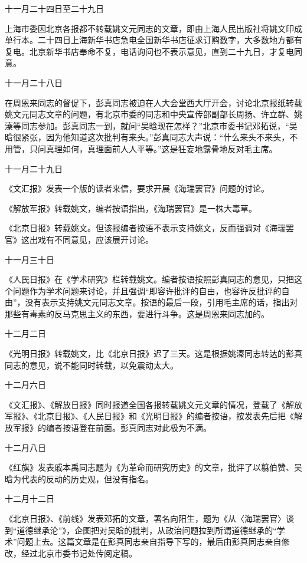 \begin{maonote}
十一月二十四日至二十九日

上海市委因北京各报都不转载姚文元同志的文章，即由上海人民出版社将姚文印成单行本。二十四日上海新华书店急电全国新华书店征求订购数字，大多数地方都有复电。北京新华书店奉命不复，电话询问也不表示意见，直到二十九日，才复电同意。

十一月二十八日

在周恩来同志的督促下，彭真同志被迫在人大会堂西大厅开会，讨论北京报纸转载姚文元同志文章的问题，有北京市委的同志和中央宣传部副部长周扬、许立群、姚溱等同志参加。彭真同志一到，就问“吴晗现在怎样？”北京市委书记邓拓说，“吴晗很紧张，因为他知道这次批判有来头。”彭真同志大声说：“什么来头不来头，不用管，只问真理如何，真理面前人人平等。”这是狂妄地露骨地反对毛主席。

十一月二十九日

《文汇报》发表一个版的读者来信，要求开展《海瑞罢官》问题的讨论。

《解放军报》转载姚文，编者按语指出，《海瑞罢官》是一株大毒草。

《北京日报》转载姚文。但该报编者按语不表示支持姚文，反而强调对《海瑞罢官》这出戏有不同意见，应该展开讨论。

十一月三十日

《人民日报》在《学术研究》栏转载姚文。编者按语按照彭真同志的意见，只把这个问题作为学术问题来讨论，并且强调“即容许批评的自由，也容许反批评的自由”，没有表示支持姚文元同志文章。按语的最后一段，引用毛主席的话，指出对那些有毒素的反马克思主义的东西，要进行斗争。这是周恩来同志加的。

十二月二日

《光明日报》转载姚文，比《北京日报》迟了三天。这是根据姚溱同志转达的彭真同志的意见，说不能同时转载，以免震动太大。

十二月六日

《文汇报》、《解放日报》同时报道全国各报转载姚文元文章的情况，登载了《解放军报》、《北京日报》、《人民日报》和《光明日报》的编者按语，按发表先后把《解放军报》的编者按语登在前面。彭真同志对此极为不满。

十二月八日

《红旗》发表戚本禹同志题为《为革命而研究历史》的文章，批评了以翦伯赞、吴晗为代表的反动的历史观，但没有指名。

十二月十二日

《北京日报》、《前线》发表邓拓的文章，署名向阳生，题为《从〈海瑞罢官〉谈到“道德继承沦”》，企图把对吴晗的批判，从政治问题拉到所谓道德继承的“学术”问题上去。这篇文章是在彭真同志亲自指导下写的，最后由彭真同志亲自修改，经过北京市委书记处传阅定稿。


\end{maonote}
